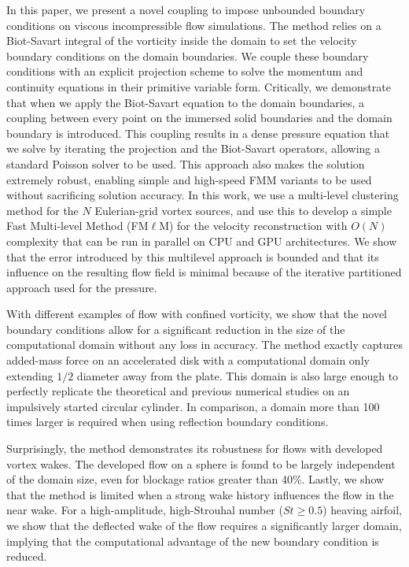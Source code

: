 \documentclass[final,1p,times]{elsarticle}
\begin{document}
In this paper, we present a novel coupling to impose unbounded boundary conditions on viscous incompressible flow simulations. The method relies on a Biot-Savart integral of the vorticity inside the domain to set the velocity boundary conditions on the domain boundaries. We couple these boundary conditions with an explicit projection scheme to solve the momentum and continuity equations in their primitive variable form. Critically, we demonstrate that when we apply the Biot-Savart equation to the domain boundaries, a coupling between every point on the immersed solid boundaries and the domain boundary is introduced. This coupling results in a dense pressure equation that we solve by iterating the projection and the Biot-Savart operators, allowing a standard Poisson solver to be used. This approach also makes the solution extremely robust, enabling simple and high-speed FMM variants to be used without sacrificing solution accuracy. In this work, we use a multi-level clustering method for the $N$ Eulerian-grid vortex sources, and use this to develop a simple Fast Multi-level Method (FM$\ell$M) for the velocity reconstruction with $O(N)$ complexity that can be run in parallel on CPU and GPU architectures. We show that the error introduced by this multilevel approach is bounded and that its influence on the resulting flow field is minimal because of the iterative partitioned approach used for the pressure.

With different examples of flow with confined vorticity, we show that the novel boundary conditions allow for a significant reduction in the size of the computational domain without any loss in accuracy. The method exactly captures added-mass force on an accelerated disk with a computational domain only extending $1/2$ diameter away from the plate. This domain is also large enough to perfectly replicate the theoretical and previous numerical studies on an impulsively started circular cylinder. In comparison, a domain more than 100 times larger is required when using reflection boundary conditions.

Surprisingly, the method demonstrates its robustness for flows with developed vortex wakes. The developed flow on a sphere is found to be largely independent of the domain size, even for blockage ratios greater than 40\%. 
Lastly, we show that the method is limited when a strong wake history influences the flow in the near wake. For a high-amplitude, high-Strouhal number ($St\ge0.5$) heaving airfoil, we show that the deflected wake of the flow requires a significantly larger domain, implying that the computational advantage of the new boundary condition is reduced.
\end{document}
